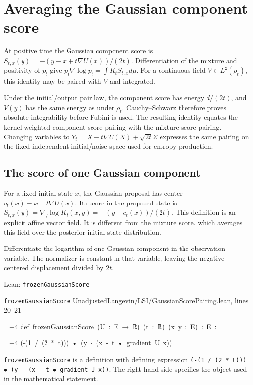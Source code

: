 \documentclass[11pt,a4paper]{report}
\newlength{\leancharwidth}
\newenvironment{leancode}{\par\smallskip\begingroup\ttfamily\footnotesize\raggedright
  \settowidth{\leancharwidth}{M}\setlength{\parskip}{0pt}\setlength{\parindent}{0pt}
  \frenchspacing}{\par\endgroup\smallskip}
\newcommand{\leanline}[2]{\hangindent=\dimexpr#1\leancharwidth+4\leancharwidth\relax
  \hangafter=1\noindent\hspace*{#1\leancharwidth}#2\par}
\newcommand{\leansource}[1]{\par{\footnotesize\color{leanmuted}#1}\par}
\newcommand{\leanlabel}[1]{\par\smallskip\noindent{\small\bfseries #1}\par}
\begin{document}
\section{\texorpdfstring{Averaging the Gaussian component score}{Averaging the Gaussian component score}}
\label{proof-module-UnadjustedLangevin-LSI-GaussianScorePairing-lean}


At positive time the Gaussian component score is \(S_{t,x}(y)=-(y-x+t\nabla U(x))/(2t)\). Differentiation of the mixture and positivity of \(p_t\) give \(p_t\nabla\log p_t=\int K_tS_{t,x}d\mu\). For a continuous field \(V\in L^2(\rho_t)\), this identity may be paired with \(V\) and integrated.



Under the initial/\allowbreak{}output pair law, the component score has energy \(d/(2t)\), and \(V(y)\) has the same energy as under \(\rho_t\). Cauchy–Schwarz therefore proves absolute integrability before Fubini is used. The resulting identity equates the kernel-weighted component-score pairing with the mixture-score pairing. Changing variables to \(Y_t=X-t\nabla U(X)+\sqrt{2t}Z\) expresses the same pairing on the fixed independent initial/\allowbreak{}noise space used for entropy production.

\subsection{\texorpdfstring{The score of one Gaussian component}{The score of one Gaussian component}}
\label{report-step-UnadjustedLangevin-LSI-GaussianScorePairing-lean-1}


For a fixed initial state \(x\), the Gaussian proposal has center \(c_t(x)=x-t\nabla U(x)\). Its score in the proposed state is \(S_{t,x}(y)=\nabla_y\log K_t(x,y)=-(y-c_t(x))/(2t)\). This definition is an explicit affine vector field. It is different from the mixture score, which averages this field over the posterior initial-state distribution.



Differentiate the logarithm of one Gaussian component in the observation variable. The normalizer is constant in that variable, leaving the negative centered displacement divided by \(2t\).

\begin{leanbox}{Lean: \texttt{frozenGaussianScore}}
\leansource{\texttt{frozenGaussianScore} \quad UnadjustedLangevin/\allowbreak{}LSI/\allowbreak{}GaussianScorePairing.lean, lines 20–21}
\begin{leancode}
\leanline{0}{def\ frozenGaussianScore\ (U\ :\ E\ →\ ℝ)\ (t\ :\ ℝ)\ (x\ y\ :\ E)\ :\ E\ :=}
\leanline{2}{(-(1\ /\ (2\ *\ t)))\ •\ (y\ -\ (x\ -\ t\ •\ gradient\ U\ x))}
\end{leancode}
\leanlabel{How the Lean proof follows the argument}
\texttt{frozen\allowbreak{}Gaussian\allowbreak{}Score} is a definition with defining expression \texttt{(-\allowbreak{}(1 /\allowbreak{} (2 * t))) \ensuremath{\bullet} (y -\allowbreak{} (x -\allowbreak{} t \ensuremath{\bullet} gradient U x))}. The right-hand side specifies the object used in the mathematical statement.
\end{leanbox}
\end{document}
